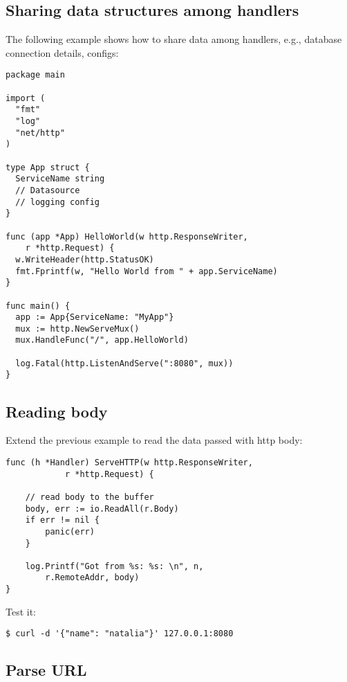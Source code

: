 \documentclass[11pt, letterpaper]{article}
\begin{document}
\pagebreak

\subsection{Sharing data structures among handlers}

The following example shows how to share data among handlers, e.g., database connection details, configs:

\begin{verbatim}
package main

import (
  "fmt"
  "log"
  "net/http"
)

type App struct {
  ServiceName string
  // Datasource
  // logging config
}

func (app *App) HelloWorld(w http.ResponseWriter,
    r *http.Request) {
  w.WriteHeader(http.StatusOK)
  fmt.Fprintf(w, "Hello World from " + app.ServiceName)
}

func main() {
  app := App{ServiceName: "MyApp"}
  mux := http.NewServeMux()
  mux.HandleFunc("/", app.HelloWorld)

  log.Fatal(http.ListenAndServe(":8080", mux))
}
\end{verbatim}

\pagebreak

\subsection{Reading body}

Extend the previous example to read the data passed with http body:

\begin{verbatim}
func (h *Handler) ServeHTTP(w http.ResponseWriter,
			r *http.Request) {

	// read body to the buffer
	body, err := io.ReadAll(r.Body)
	if err != nil {  
		panic(err)
	}

	log.Printf("Got from %s: %s: \n", n,
		r.RemoteAddr, body)
}
\end{verbatim}

Test it:

\begin{verbatim}
$ curl -d '{"name": "natalia"}' 127.0.0.1:8080 
\end{verbatim}

\subsection{Parse URL}
\end{document}
